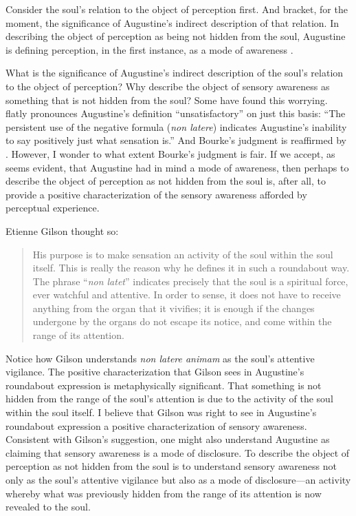 \documentclass[12pt]{article}
\begin{document}
Consider the soul's relation to the object of perception first. And bracket, for the moment, the significance of Augustine's indirect description of that relation. In describing the object of perception as being not hidden from the soul, Augustine is defining perception, in the first instance, as a mode of awareness \citep[275]{Brittain:2002hl}. 

What is the significance of Augustine's indirect description of the soul's relation to the object of perception? Why describe the object of sensory awareness as something that is not hidden from the soul? Some have found this worrying. \citet[112]{Bourke:1947jk} flatly pronounces Augustine's definition ``unsatisfactory'' on just this basis: ``The persistent use of the negative formula (\emph{non latere}) indicates Augustine's inability to say positively just what sensation is.'' And Bourke's judgment is reaffirmed by \citet[104, n.1]{McMahon:1947dn}. However, I wonder to what extent Bourke's judgment is fair. If we accept, as seems evident, that Augustine had in mind a mode of awareness, then perhaps to describe the object of perception as not hidden from the soul is, after all, to provide a positive characterization of the sensory awareness afforded by perceptual experience.

Etienne Gilson thought so:
\begin{quote}
	His purpose is to make sensation an activity of the soul within the soul itself. This is really the reason why he defines it in such a roundabout way. The phrase ``\emph{non latet}'' indicates precisely that the soul is a spiritual force, ever watchful and attentive. In order to sense, it does not have to receive anything from the organ that it vivifies; it is enough if the changes undergone by the organs do not escape its notice, and come within the range of its attention. \citep[63]{Gilson:1961ec}
\end{quote}
Notice how Gilson understands \emph{non latere animam} as the soul's attentive vigilance. The positive characterization that Gilson sees in Augustine's roundabout expression is metaphysically significant. That something is not hidden from the range of the soul's attention is due to the activity of the soul within the soul itself. I believe that Gilson was right to see in Augustine's roundabout expression a positive characterization of sensory awareness. Consistent with Gilson's suggestion, one might also understand Augustine as claiming that sensory awareness is a mode of disclosure. To describe the object of perception as not hidden from the soul is to understand sensory awareness not only as the soul's attentive vigilance but also as a mode of disclosure---an activity whereby what was previously hidden from the range of its attention is now revealed to the soul.
\end{document}

